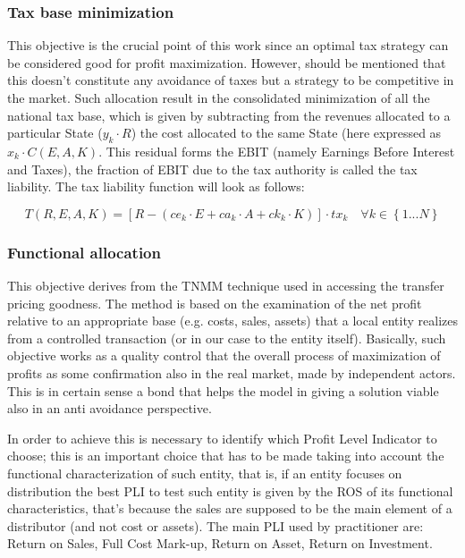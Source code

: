 \documentclass{article}
\begin{document}
\subsubsection{Tax base minimization}
This objective is the crucial point of this work since an optimal tax strategy can be considered good for profit maximization. However, should be mentioned that this doesn't constitute any avoidance of taxes but a strategy to be competitive in the market. Such allocation result in the consolidated minimization of all the national tax base, which is given by subtracting from the revenues allocated to a particular State ($y_k \cdot R$) the cost allocated to the same State (here expressed as $x_k \cdot C(E, A,K)$. This residual forms the EBIT (namely Earnings Before Interest and Taxes), the fraction of EBIT due to the tax authority is called the tax liability. The tax liability function will look as follows:

\begin{equation}
T(R,E,A,K)= [R-(ce_k\cdot E+ca_k\cdot A+ck_k\cdot K)]\cdot tx_k \quad \forall k \in \left\{1...N\right\}
\end{equation}

\subsubsection{Functional allocation}
This objective derives from the TNMM technique used in accessing the transfer pricing goodness. The method is based on the examination of the net profit relative to an appropriate base (e.g. costs, sales, assets) that a local entity realizes from a controlled transaction (or in our case to the entity itself). Basically, such objective works as a quality control that the overall process of maximization of profits as some confirmation also in the real market, made by independent actors. This is in certain sense a bond that helps the model in giving a solution viable also in an anti avoidance perspective.

In order to achieve this is necessary to identify which Profit Level Indicator to choose; this is an important choice that has to be made taking into account the functional characterization of such entity, that is, if an entity focuses on distribution the best PLI to test such entity is given by the ROS of its functional characteristics, that's because the sales are supposed to be the main element of a distributor (and not cost or assets). The main PLI used by practitioner are: Return on Sales, Full Cost Mark-up, Return on Asset, Return on Investment.
\end{document}
